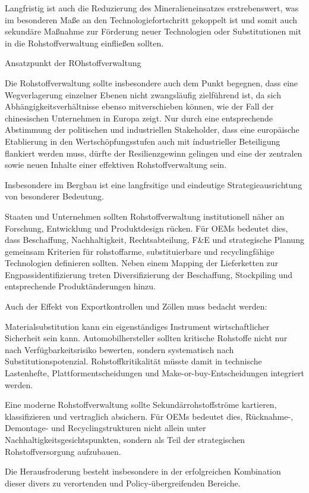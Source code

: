 \documentclass[12pt,a4paper,oneside]{book} %
\begin{document}
Langfristig ist auch die Reduzierung des Mineralieneinsatzes erstrebenswert, was im besonderen Maße an den Technologiefortschritt gekoppelt ist und somit auch sekundäre Maßnahme zur Förderung neuer Technologien oder Substitutionen mit in die Rohstoffverwaltung einfließen sollten.

Ansatzpunkt der ROhstoffverwaltung

Die Rohstoffverwaltung sollte insbesondere auch dem Punkt begegnen, dass eine Wegverlagerung einzelner Ebenen nicht zwangsläufig zielführend ist, da sich Abhängigkeitsverhältnisse ebenso mitverschieben können, wie der Fall der chinesischen Unternehmen in Europa zeigt. Nur durch eine entsprechende Abstimmung der politischen und industriellen Stakeholder, dass eine europäische Etablierung in den Wertschöpfungsstufen auch mit índustrieller Beteiligung flankiert werden muss, dürfte der Resilienzgewinn gelingen und eine der zentralen sowie neuen Inhalte einer effektiven Rohstoffverwaltung sein.

Insbesondere im Bergbau ist eine langfrsitige und eindeutige Strategieausrichtung von besonderer Bedeutung.

Staaten und Unternehmen sollten Rohstoffverwaltung institutionell näher an Forschung, Entwicklung und Produktdesign rücken. Für OEMs bedeutet dies, dass Beschaffung, Nachhaltigkeit, Rechtsabteilung, F&E und strategische Planung gemeinsam Kriterien für rohstoffarme, substituierbare und recyclingfähige Technologien definieren sollten. Neben einem Mapping der Lieferketten zur Engpassidentifizierung treten Diversifizierung der Beschaffung, Stockpiling und entsprechende Produktänderungen hinzu.

Auch der Effekt von Exportkontrollen und Zöllen muss bedacht werden:

Materialsubstitution kann ein eigenständiges Instrument wirtschaftlicher Sicherheit sein kann. Automobilhersteller sollten kritische Rohstoffe nicht nur nach Verfügbarkeitsrisiko bewerten, sondern systematisch nach Substitutionspotenzial. Rohstoffkritikalität müsste damit in technische Lastenhefte, Plattformentscheidungen und Make-or-buy-Entscheidungen integriert werden.

Eine moderne Rohstoffverwaltung sollte Sekundärrohstoffströme kartieren, klassifizieren und vertraglich absichern. Für OEMs bedeutet dies, Rücknahme-, Demontage- und Recyclingstrukturen nicht allein unter Nachhaltigkeitsgesichtspunkten, sondern als Teil der strategischen Rohstoffversorgung aufzubauen.

Die Herausfroderung besteht insbesondere in der erfolgreichen Kombination dieser divers zu verortenden und Policy-übergreifenden Bereiche.
\end{document}
